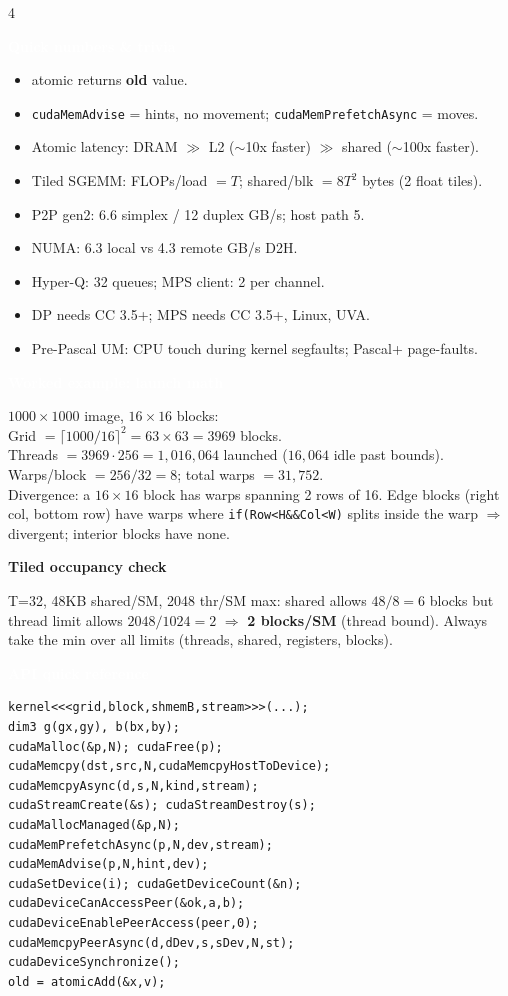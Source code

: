 \documentclass[10pt]{extarticle}
\newcommand{\sect}[1]{\vspace{3pt}\par\colorbox{hdr}{\textcolor{white}{\textbf{\small #1}}}\par\vspace{2pt}}
\newcommand{\sub}[1]{\vspace{2pt}\par\textbf{\footnotesize\textcolor{hdr}{#1}}\par}
\begin{document}
\begin{multicols*}{4}
\sect{Quick numbers \& trivia}
\begin{itemize}
\item atomic returns \textbf{old} value.
\item \texttt{cudaMemAdvise} = hints, no movement; \texttt{cudaMemPrefetchAsync} = moves.
\item Atomic latency: DRAM $\gg$ L2 ($\sim$10x faster) $\gg$ shared ($\sim$100x faster).
\item Tiled SGEMM: FLOPs/load $=T$; shared/blk $=8T^2$ bytes (2 float tiles).
\item P2P gen2: 6.6 simplex / 12 duplex GB/s; host path 5.
\item NUMA: 6.3 local vs 4.3 remote GB/s D2H.
\item Hyper-Q: 32 queues; MPS client: 2 per channel.
\item DP needs CC 3.5+; MPS needs CC 3.5+, Linux, UVA.
\item Pre-Pascal UM: CPU touch during kernel segfaults; Pascal+ page-faults.
\end{itemize}

\sect{Worked example: launch math}
$1000{\times}1000$ image, $16{\times}16$ blocks:\\
Grid $= \lceil 1000/16\rceil^2 = 63{\times}63 = 3969$ blocks.\\
Threads $= 3969{\cdot}256 = 1{,}016{,}064$ launched ($16{,}064$ idle past bounds).\\
Warps/block $= 256/32 = 8$; total warps $= 31{,}752$.\\
Divergence: a $16{\times}16$ block has warps spanning 2 rows of 16. Edge blocks (right col, bottom row) have warps where \texttt{if(Row<H\&\&Col<W)} splits inside the warp $\Rightarrow$ divergent; interior blocks have none.

\sub{Tiled occupancy check}
T=32, 48KB shared/SM, 2048 thr/SM max: shared allows $48/8=6$ blocks but thread limit allows $2048/1024=2$ $\Rightarrow$ \textbf{2 blocks/SM} (thread bound). Always take the min over all limits (threads, shared, registers, blocks).

\sect{API quick reference}
\begin{lstlisting}
kernel<<<grid,block,shmemB,stream>>>(...);
dim3 g(gx,gy), b(bx,by);
cudaMalloc(&p,N); cudaFree(p);
cudaMemcpy(dst,src,N,cudaMemcpyHostToDevice);
cudaMemcpyAsync(d,s,N,kind,stream);
cudaStreamCreate(&s); cudaStreamDestroy(s);
cudaMallocManaged(&p,N);
cudaMemPrefetchAsync(p,N,dev,stream);
cudaMemAdvise(p,N,hint,dev);
cudaSetDevice(i); cudaGetDeviceCount(&n);
cudaDeviceCanAccessPeer(&ok,a,b);
cudaDeviceEnablePeerAccess(peer,0);
cudaMemcpyPeerAsync(d,dDev,s,sDev,N,st);
cudaDeviceSynchronize();
old = atomicAdd(&x,v);
\end{lstlisting}


\end{multicols*}
\end{document}
